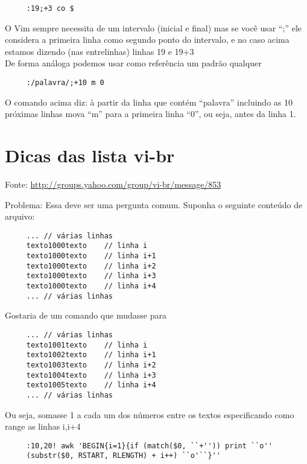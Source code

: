 \begin{verbatim}
     :19;+3 co $
\end{verbatim}

O Vim sempre necessita de um intervalo (inicial e final) mas se você
usar ``;'' ele considera a primeira linha como segundo ponto do
intervalo, e no caso acima estamos dizendo (nas entrelinhas) linhas
19 e 19+3     \\


De forma análoga podemos usar como referência um padrão qualquer

\begin{verbatim}
     :/palavra/;+10 m 0
\end{verbatim}

O comando acima diz: à partir da linha que contém ``palavra'' incluindo as 10 próximas linhas
mova ``m'' para a primeira linha ``0'', ou seja, antes da linha 1.

\section{Dicas das lista vi-br}

 Fonte: \url{http://groups.yahoo.com/group/vi-br/message/853}

 Problema:
 Essa deve ser uma pergunta comum.
 Suponha o seguinte conteúdo de arquivo:

\begin{verbatim}
     ... // várias linhas
     texto1000texto    // linha i
     texto1000texto    // linha i+1
     texto1000texto    // linha i+2
     texto1000texto    // linha i+3
     texto1000texto    // linha i+4
     ... // várias linhas
\end{verbatim}

Gostaria de um comando que mudasse para

\begin{verbatim}
     ... // várias linhas
     texto1001texto    // linha i
     texto1002texto    // linha i+1
     texto1003texto    // linha i+2
     texto1004texto    // linha i+3
     texto1005texto    // linha i+4
     ... // várias linhas
\end{verbatim}

 Ou seja, somasse 1 a cada um dos números entre os textos
 especificando como range as linhas i,i+4

\begin{verbatim}
     :10,20! awk 'BEGIN{i=1}{if (match($0, ``+'')) print ``o''
     (substr($0, RSTART, RLENGTH) + i++) ``o'``}''
\end{verbatim}

